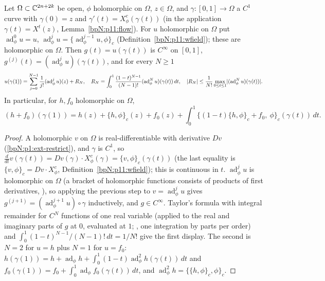 \begin{lemma}\label{bpN:p11:ext-taylor}
Let $\Omega\subset\mathbb{C}^{2n+2k}$ be open, $\phi$ holomorphic on $\Omega$, $z\in\Omega$, and $\gamma:[0,1]\to\Omega$ a $C^1$ curve with $\gamma(0)=z$ and $\gamma'(t)=X^c_\phi(\gamma(t))$ (in the application $\gamma(t)=X^t(z)$, Lemma~\ref{bpN:p11:flow}). For $u$ holomorphic on $\Omega$ put $\operatorname{ad}^0_\phi u=u$, $\operatorname{ad}^j_\phi u=\{\operatorname{ad}^{j-1}_\phi u,\phi\}_c$ (Definition~\ref{bpN:p11:wfield}); these are holomorphic on $\Omega$. Then $g(t)=u(\gamma(t))$ is $C^\infty$ on $[0,1]$, $g^{(j)}(t)=(\operatorname{ad}^j_\phi u)(\gamma(t))$, and for every $N\ge1$
\[u(\gamma(1))=\sum_{j=0}^{N-1}\frac1{j!}(\operatorname{ad}^j_\phi u)(z)+R_N,\quad R_N=\int_0^1\frac{(1-t)^{N-1}}{(N-1)!}(\operatorname{ad}^N_\phi u)(\gamma(t))\,dt,\quad\lvert R_N\rvert\le\frac1{N!}\max_{0\le t\le1}\lvert (\operatorname{ad}^N_\phi u)(\gamma(t))\rvert.\]
In particular, for $h,f_0$ holomorphic on $\Omega$,
\[(h+f_0)(\gamma(1))=h(z)+\{h,\phi\}_c(z)+f_0(z)+\int_0^1\bigl\{(1-t)\{h,\phi\}_c+f_0,\ \phi\bigr\}_c(\gamma(t))\,dt .\]
\end{lemma}
\begin{proof}
\label{stepN:p11:et-one} A holomorphic $v$ on $\Omega$ is real-differentiable with derivative $Dv$ (\ref{bpN:p1:ext-restrict}), and $\gamma$ is $C^1$, so $\frac d{dt}v(\gamma(t))=Dv(\gamma)\cdot X^c_\phi(\gamma)=\{v,\phi\}_c(\gamma(t))$ (the last equality is $\{v,\phi\}_c=Dv\cdot X^c_\phi$, Definition~\ref{bpN:p11:wfield}); this is continuous in $t$.
\label{stepN:p11:et-ind} $\operatorname{ad}^j_\phi u$ is holomorphic on $\Omega$ (a bracket of holomorphic functions consists of products of first derivatives, ), so applying the previous step to $v=\operatorname{ad}^{j}_\phi u$ gives $g^{(j+1)}=(\operatorname{ad}^{j+1}_\phi u)\circ\gamma$ inductively, and $g\in C^\infty$.
\label{stepN:p11:et-taylor} Taylor's formula with integral remainder for $C^N$ functions of one real variable (applied to the real and imaginary parts of $g$ at $0$, evaluated at $1$; , one integration by parts per order) and $\int_0^1(1-t)^{N-1}/(N-1)!\,dt=1/N!$ give the first display. The second is $N=2$ for $u=h$ plus $N=1$ for $u=f_0$: $h(\gamma(1))=h+\operatorname{ad}_\phi h+\int_0^1(1-t)\operatorname{ad}^2_\phi h(\gamma(t))\,dt$ and $f_0(\gamma(1))=f_0+\int_0^1\operatorname{ad}_\phi f_0(\gamma(t))\,dt$, and $\operatorname{ad}^2_\phi h=\{\{h,\phi\}_c,\phi\}_c$.
\end{proof}

